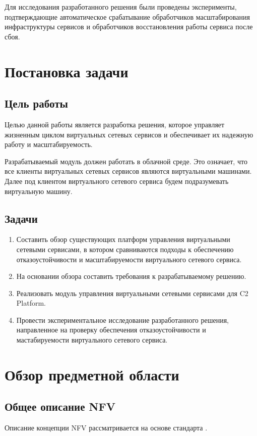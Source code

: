 \documentclass[oneside,final,14pt,a4paper]{extreport}
\begin{document}
Для исследования разработанного решения были проведены эксперименты, подтверждающие автоматическое срабатывание обработчиков масштабирования инфраструктуры сервисов и обработчиков восстановления работы сервиса после сбоя.





\chapter{Постановка задачи}
\label{chap:problem_statement}
\section{Цель работы}
Целью данной работы является разработка решения, которое управляет жизненным циклом виртуальных сетевых сервисов и обеспечивает их надежную работу и масштабируемость.

Разрабатываемый модуль должен работать в облачной среде. Это означает, что все клиенты виртуальных сетевых сервисов являются виртуальными машинами. Далее под клиентом виртуального сетевого сервиса будем подразумевать виртуальную машину.

\section{Задачи}
\begin{enumerate}
	\item Составить обзор существующих платформ управления виртуальными сетевыми сервисами, в котором сравниваются подходы к обеспечению отказоустойчивости и масштабируемости виртуального сетевого сервиса.
	\item На основании обзора составить требования к разрабатываемому решению.
	\item Реализовать модуль управления виртуальными сетевыми сервисами для C2 Platform.
	\item Провести экспериментальное исследование разработанного решения, направленное на проверку обеспечения отказоустойчивости и мастабируемости виртуального сетевого сервиса.
\end{enumerate}




\chapter{Обзор предметной области}
\label{chap:overview_subject_area}

\section{Общее описание NFV}
\label{sec:nfv_description}
Описание концепции NFV рассматривается на основе стандарта \cite{nfv-official}.
\end{document}
